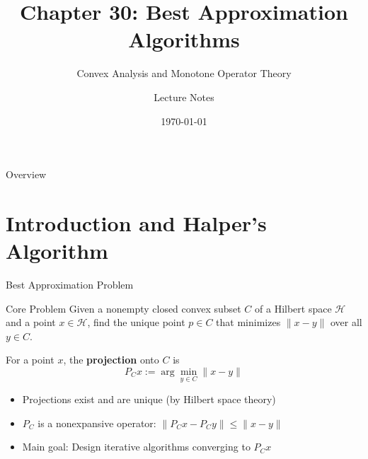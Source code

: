 \documentclass[aspectratio=169,10pt]{beamer}
\title[Chapter 30: Best Approximation Algorithms]{Chapter 30: Best Approximation Algorithms}
\subtitle{Convex Analysis and Monotone Operator Theory}
\author[]{Lecture Notes}
\date{\today}
\begin{document}
\begin{frame}
  \titlepage
\end{frame}

\begin{frame}{Overview}
  \tableofcontents
\end{frame}

\section{Introduction and Halper's Algorithm}

\begin{frame}{Best Approximation Problem}
  \begin{block}{Core Problem}
    Given a nonempty closed convex subset $C$ of a Hilbert space $\mathcal{H}$ and a point $x \in \mathcal{H}$, find the unique point $p \in C$ that minimizes $\|x - y\|$ over all $y \in C$.
  \end{block}

  \vspace{0.3cm}

  \begin{definition}
    For a point $x$, the \textbf{projection} onto $C$ is
    \[
      P_C x := \arg\min_{y \in C} \|x - y\|
    \]
  \end{definition}

  \vspace{0.3cm}

  \begin{itemize}
    \item Projections exist and are unique (by Hilbert space theory)
    \item $P_C$ is a nonexpansive operator: $\|P_C x - P_C y\| \leq \|x - y\|$
    \item Main goal: Design iterative algorithms converging to $P_C x$
  \end{itemize}
\end{frame}

\end{document}
